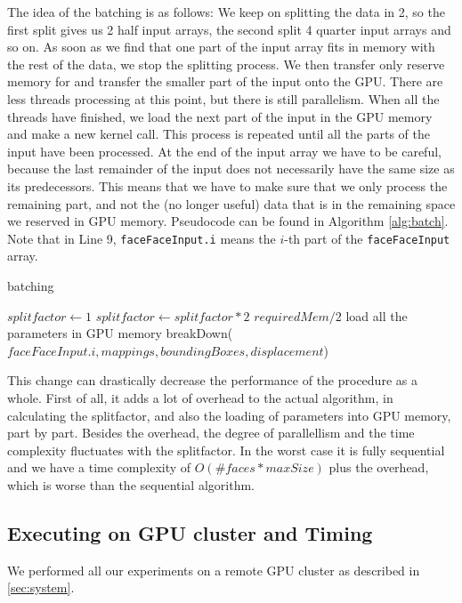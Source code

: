 The idea of the batching is as follows: We keep on splitting the data in 2, so the first split gives us 2 half input arrays, the second split 4 quarter input arrays and so on. As soon as we find that one part of the input array fits in memory with the rest of the data, we stop the splitting process. We then transfer only reserve memory for and transfer the smaller part of the input onto the GPU. There are less threads processing at this point, but there is still parallelism. When all the threads have finished, we load the next part of the input in the GPU memory and make a new kernel call. This process is repeated until all the parts of the input have been processed. At the end of the input array we have to be careful, because the last remainder of the input does not necessarily have the same size as its predecessors. This means that we have to make sure that we only process the remaining part, and not the (no longer useful) data that is in the remaining space we reserved in GPU memory. Pseudocode can be found in Algorithm \ref{alg:batch}. Note that in Line 9, \texttt{faceFaceInput.i} means the $i$-th part of the \texttt{faceFaceInput} array.

\begin{algorithm}
\caption{batching}\label{alg:batch}
\begin{algorithmic}[1]
    \State $splitfactor \gets 1$
        \State $splitfactor \gets splitfactor * 2$
        \State $requiredMem / 2$
    \EndWhile
        \State load all the parameters in GPU memory
        \State breakDown($faceFaceInput.i, mappings, boundingBoxes, displacement $) 
    \EndFor
\EndProcedure
\end{algorithmic}
\end{algorithm}

This change can drastically decrease the performance of the procedure as a whole. First of all, it adds a lot of overhead to the actual algorithm, in calculating the splitfactor, and also the loading of parameters into GPU memory, part by part. Besides the overhead, the degree of parallellism and the time complexity fluctuates with the splitfactor. In the worst case it is fully sequential and we have a time complexity of $O(\#faces *  maxSize)$ plus the overhead, which is worse than the sequential algorithm.

\subsection{Executing on GPU cluster and Timing}
We performed all our experiments on a remote GPU cluster as described in \ref{sec:system}.

